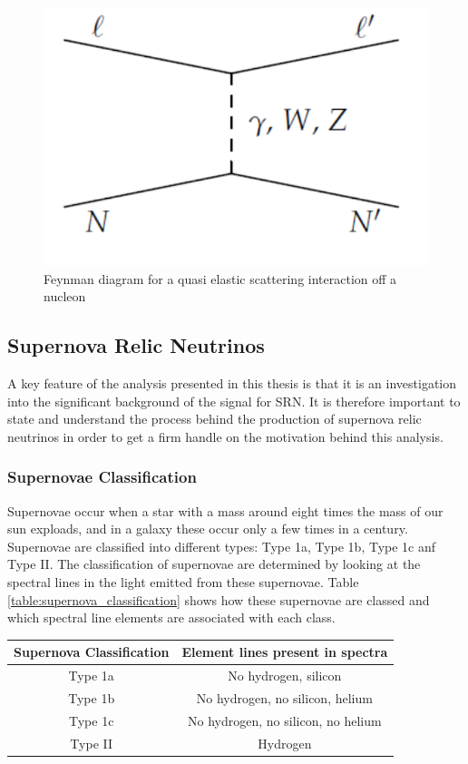 \begin{figure}
    \includegraphics[width=\textwidth]{Figures/QE_feynman.png}
    \caption{Feynman diagram for a quasi elastic scattering interaction off a nucleon}
    \label{fig:QE_reaction}
\end{figure}


\subsection{Supernova Relic Neutrinos}

A key feature of the analysis presented in this thesis is that it is an investigation into the significant background of the signal for SRN. It is therefore important to state and understand the process behind the production of supernova relic neutrinos in order to get a firm handle on the motivation behind this analysis. 

\subsubsection{Supernovae Classification}
Supernovae occur when a star with a mass around eight times the mass of our sun exploads, and in a galaxy these occur only a few times in a century. Supernovae are classified into different types: Type 1a, Type 1b, Type 1c anf Type II. The classification of supernovae are determined by looking at the spectral lines in the light emitted from these supernovae. Table \ref{table:supernova_classification} shows how these supernovae are classed and which spectral line elements are associated with each class. 

\begin{center}
\begin{tabular}{||c c||} 
    \hline
    Supernova Classification & Element lines present in spectra \\ 
    \hline \hline
    Type 1a & No hydrogen, silicon  \\ 
    \hline
    Type 1b & No hydrogen, no silicon, helium  \\
    \hline
    Type 1c & No hydrogen, no silicon, no helium  \\
    \hline
    Type II & Hydrogen  \\
    \hline \hline
\end{tabular}
\label{table:supernova_classification}
\end{center}

